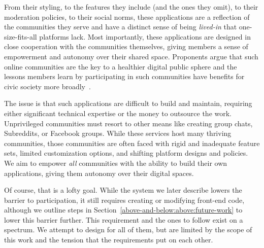 
%
From their styling, to the features they include (and the ones they omit),
to their moderation policies, to their social norms, these applications
are a reflection of the communities they serve and have a
distinct sense of being \emph{lived-in}
that one-size-fits-all platforms lack.
Most importantly, these applications are designed in close cooperation with the communities themselves,
giving members a sense of empowerment and autonomy over their shared space.
Proponents argue that such online communities are the key to a healthier
digital public sphere and the lessons members learn by participating in such
communities have benefits for civic society more broadly~\cite{threeleggedstool, runyourownsocial, archiveoftheirown}.

The issue is that such applications are difficult to build and maintain,
requiring either significant technical expertise or the money to outsource the work.
Unprivileged communities must resort to other means like creating group chats,
Subreddits, or Facebook groups. %
While these services host many thriving communities,
those communities are often faced with rigid and inadequate feature sets,
limited customization options, and shifting platform designs and policies.
We aim to empower \emph{all} communities with the ability to
build their own applications, giving them autonomy over their digital spaces.

Of course, that is a lofty goal. While the system
we later describe lowers the barrier to participation,
it still requires creating or modifying front-end code, although
we outline steps in Section~\ref{above-and-below:above:future-work}
to lower this barrier further.
This requirement and the ones to follow exist on a spectrum.
We attempt to design for all of them, but are limited by
the scope of this work and the tension that the requirements put
on each other.




